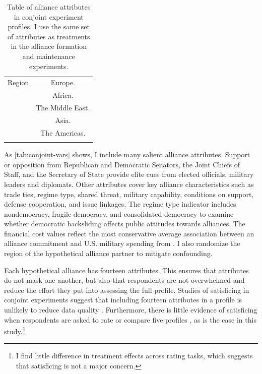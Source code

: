 \documentclass[12pt]{article}
\begin{document}
\begin{table}
\begin{adjustbox}{width = .99\textwidth}
\begin{tabular}{lc}
Region              & Europe. \\ 
                    & Africa. \\
                    & The Middle East. \\ 
                    & Asia. \\   
                    & The Americas. \\ 
                                                                            
\hline \\
\end{tabular}
\end{adjustbox}
\caption{Table of alliance attributes in conjoint experiment profiles. I use the same set of attributes as treatments in the alliance formation and maintenance experiments.} 
\label{tab:conjoint-vars}
\end{table}


As \autoref{tab:conjoint-vars} shows, I include many salient alliance attributes.
Support or opposition from Republican and Democratic Senators, the Joint Chiefs of Staff, and the Secretary of State provide elite cues from elected officials, military leaders and diplomats. 
Other attributes cover key alliance characteristics such as trade ties, regime type, shared threat, military capability, conditions on support, defense cooperation, and issue linkages.
The regime type indicator includes nondemocracy, fragile democracy, and consolidated democracy to examine whether democratic backsliding affects public attitudes towards alliances. 
The financial cost values reflect the most conservative average association between an alliance commitment and U.S. military spending from \citet{AlleyFuhrmann2021}. 
I also randomize the region of the hypothetical alliance partner to mitigate confounding.  


Each hypothetical alliance has fourteen attributes.
This ensures that attributes do not mask one another, but also that respondents are not overwhelmed and reduce the effort they put into assessing the full profile.
Studies of satisficing in conjoint experiments suggest that including fourteen attributes in a profile is unlikely to reduce data quality \citep{Bansaketal2019}. 
Furthermore, there is little evidence of satisficing when respondents are asked to rate or compare five profiles \citep{Bansaketal2018}, as is the case in this study.\footnote{I find little difference in treatment effects across rating tasks, which suggests that satisficing is not a major concern.} 
\end{document}
